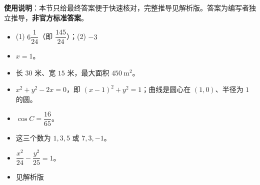 
\begin{gknotice}
\textbf{使用说明}：本节只给最终答案便于快速核对，完整推导见解析版。答案为编写者独立推导，\textbf{非官方标准答案}。
\end{gknotice}

\begin{itemize}[leftmargin=2.6em]
  \item[\textbf{1.}] (1) $6\dfrac1{24}$（即 $\dfrac{145}{24}$）；(2) $-3$
  \item[\textbf{2.}] $x=1$。
  \item[\textbf{3.}] 长 $30$ 米、宽 $15$ 米，最大面积 $450\ \mathrm{m^2}$。
  \item[\textbf{4.}] $x^2+y^2-2x=0$，即 $(x-1)^2+y^2=1$；曲线是圆心在 $(1,0)$、半径为 $1$ 的圆。
  \item[\textbf{5.}] $\cos C=\dfrac{16}{65}$。
  \item[\textbf{6.}] 这三个数为 $1,3,5$ 或 $7,3,-1$。
  \item[\textbf{7.}] $\dfrac{x^2}{24}-\dfrac{y^2}{25}=1$。
  \item[\textbf{8.}] 见解析版
\end{itemize}

